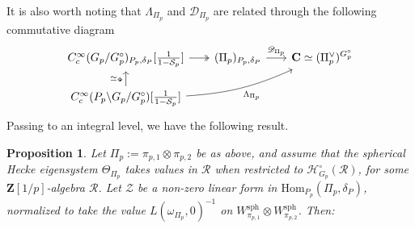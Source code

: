 \documentclass{amsart}%
\theoremstyle{plain}
\newtheorem{prop}[thm]{Proposition}
\theoremstyle{plain}
\theoremstyle{remark}
\begin{document}
It is also worth noting that $\Lambda_{\Pi_p}$ and $\mathscr{D}_{\Pi_p}$ are related through the following commutative diagram 
\[\begin{tikzcd}[ampersand replacement=\&,sep=scriptsize]
	{C_c^\infty(G_p/G_p^\circ)_{P_p,\delta_P}[\tfrac{1}{1-\mathcal{S}_p}]} \& {(\Pi_p)_{P_p,\delta_P}} \& {\mathbf{C}\simeq(\Pi_p^\vee)^{G_p^\circ}} \\
	{C_c^\infty(P_p\backslash G_p/G_p^\circ)[\tfrac{1}{1-\mathcal{S}_p}]}
	\arrow[two heads, from=1-1, to=1-2]
	\arrow["{\mathscr{D}_{\Pi_p}}", from=1-2, to=1-3]
	\arrow["{\simeq_\Phi}", from=2-1, to=1-1]
	\arrow[bend right =10,"{\Lambda_{\Pi_p}}"', from=2-1, to=1-3]
\end{tikzcd}\]
Passing to an integral level, we have the following result.
\begin{prop}\label{thm integral P-lattice for pi1 x pi2 }
    Let $\Pi_p:=\pi_{p,1}\otimes \pi_{p,2}$ be as above, and assume that the spherical Hecke eigensystem $\Theta_{\Pi_{p}}$ takes values in $\mathcal{R}$ when restricted to $\mathcal{H}_{G_p}^\circ(\mathcal{R})$, for some $\mathbf{Z}[1/p]$-algebra $\mathcal{R}$. Let $\mathcal{Z}$ be a non-zero linear form in $\mathrm{Hom}_{P_p}(\Pi_p,\delta_P)$, normalized to take the value $L(\omega_{\Pi_p},0)^{-1}$ on $W_{\pi_{p,1}}^\mathrm{sph}\otimes W_{\pi_{p,2}}^\mathrm{sph}$. Then:
    \begin{enumerate}
    

\end{enumerate}
\end{prop}
\end{document}
